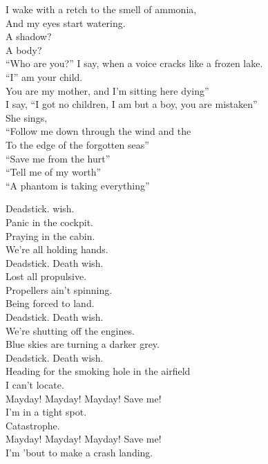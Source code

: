 I wake with a retch to the smell of ammonia, \\
And my eyes start watering. \\
A shadow? \\
A body? \\
``Who are you?'' I say, when a voice cracks like a frozen lake. \\
``I'' am your child. \\
You are my mother, and I'm sitting here dying'' \\
I say, ``I got no children, I am but a boy, you are mistaken'' \\

She sings, \\
``Follow me down through the wind and the  \\
To the edge of the forgotten seas'' \\
``Save me from the hurt'' \\
``Tell me of my worth'' \\
``A phantom is taking everything'' \\


Deadstick.  wish. \\
Panic in the cockpit. \\
Praying in the cabin. \\
We're all holding hands. \\
Deadstick. Death wish. \\
Lost all propulsive. \\
Propellers ain't spinning. \\
Being forced to land. \\

Deadstick. Death wish. \\
We're shutting off the engines. \\
Blue skies are turning a darker grey. \\
Deadstick. Death wish. \\
Heading for the smoking hole in the airfield \\
I can't locate. \\

Mayday! Mayday! Mayday! Save me! \\
I'm in a tight spot. \\
Catastrophe. \\
Mayday! Mayday! Mayday! Save me! \\
I'm 'bout to make a crash landing. \\

